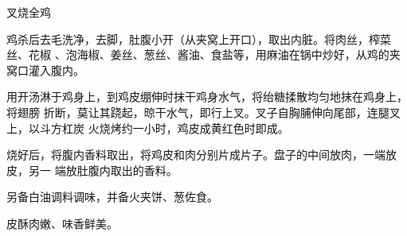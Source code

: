 \begin{recipe}{叉烧全鸡}

\ingredients


\preparation

鸡杀后去毛洗净，去脚，肚腹小开（从夹窝上开口），取出内脏。将肉丝，榨菜丝、花椒
、泡海椒、姜丝、葱丝、酱油、食盐等，用麻油在锅中炒好，从鸡的夹窝口灌入腹内。

用开汤淋于鸡身上，到鸡皮绷伸时抹干鸡身水气，将绐糖揉散均匀地抹在鸡身上，将翅膀
折断，莫让其跷起，晾干水气，即行上叉。叉子自胸脯伸向尾部，连腿叉上，以斗方杠炭
火烧烤约一小时，鸡皮成黄红色时即成。

烧好后，将腹内香料取出，将鸡皮和肉分别片成片子。盘子的中间放肉，一端放皮，另一
端放肚腹内取出的香料。

另备白油调料调味，并备火夹饼、葱佐食。

\features

皮酥肉嫩、味香鲜美。

\end{recipe}

